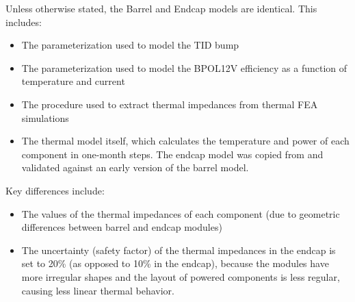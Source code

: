 Unless otherwise stated, the Barrel and Endcap models are identical. This includes:
\begin{itemize}
  \item The parameterization used to model the TID bump
  \item The parameterization used to model the BPOL12V efficiency as a function of temperature
    and current
  \item The procedure used to extract thermal impedances from thermal FEA simulations
  \item The thermal model itself, which calculates the temperature and power of each component in 
    one-month steps. The endcap model was copied from and validated against an early version
    of the barrel model.
\end{itemize}

Key differences include:
\begin{itemize}
  \item The values of the thermal impedances of each component (due to geometric differences between
    barrel and endcap modules)
  \item The uncertainty (safety factor) of the thermal impedances in the endcap is set to 20\% (as
    opposed to 10\% in the endcap), because the modules have more irregular shapes and the layout of
    powered components is less regular, causing less linear thermal behavior.
\end{itemize}
